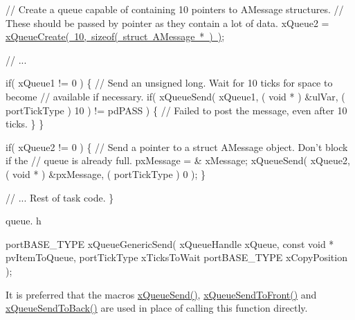 \begin{DoxyPre}   // Create a queue capable of containing 10 pointers to AMessage structures.
   // These should be passed by pointer as they contain a lot of data.
   xQueue2 = \mbox{\hyperlink{queue_8h_aeb858b824bd74a934ea7ebb81af2a6bb}{xQueueCreate( 10, sizeof( struct AMessage * ) )}};\end{DoxyPre}



\begin{DoxyPre}   // ...\end{DoxyPre}



\begin{DoxyPre}   if( xQueue1 != 0 )
   \{
    // Send an unsigned long.  Wait for 10 ticks for space to become
    // available if necessary.
    if( xQueueSend( xQueue1, ( void * ) \&ulVar, ( portTickType ) 10 ) != pdPASS )
    \{
        // Failed to post the message, even after 10 ticks.
    \}
   \}\end{DoxyPre}



\begin{DoxyPre}   if( xQueue2 != 0 )
   \{
    // Send a pointer to a struct AMessage object.  Don't block if the
    // queue is already full.
    pxMessage = \& xMessage;
    xQueueSend( xQueue2, ( void * ) \&pxMessage, ( portTickType ) 0 );
   \}\end{DoxyPre}



\begin{DoxyPre}   // ... Rest of task code.
\}
\end{DoxyPre}


queue. h 
\begin{DoxyPre}
portBASE\_TYPE xQueueGenericSend(
                                xQueueHandle xQueue,
                                const void * pvItemToQueue,
                                portTickType xTicksToWait
                                portBASE\_TYPE xCopyPosition
                            );
  \end{DoxyPre}


It is preferred that the macros \mbox{\hyperlink{queue_8h_af7eb49d3249351176992950d9185abe9}{x\+Queue\+Send()}}, \mbox{\hyperlink{queue_8h_aa612fcc2b1ceee0200f34b942e300b41}{x\+Queue\+Send\+To\+Front()}} and \mbox{\hyperlink{queue_8h_a81d24a2c1199d58efb76fbee15853112}{x\+Queue\+Send\+To\+Back()}} are used in place of calling this function directly.

